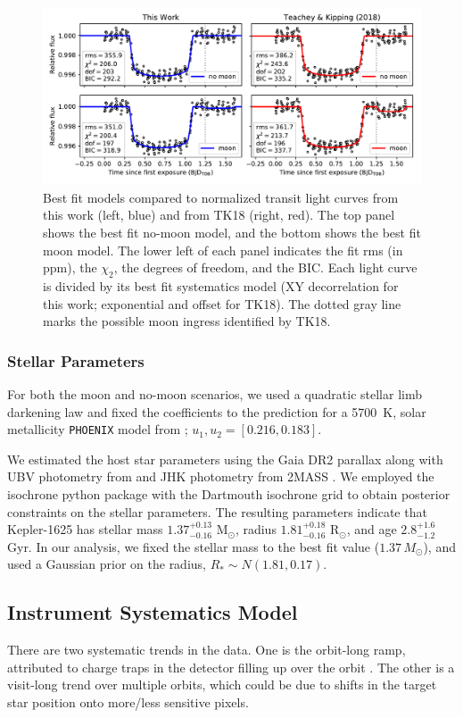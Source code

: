 \documentclass[twocolumn]{aastex62}
\begin{document}
\begin{figure}
\includegraphics[width = 1.0 \textwidth]{fig3_bestfits.pdf}
    \caption{Best fit models compared to normalized transit light curves from this work (left, blue) and from TK18 (right, red). The top panel shows the best fit no-moon model, and the bottom shows the best fit moon model. The lower left of each panel indicates the fit rms (in ppm), the $\chi_2$, the degrees of freedom, and the BIC.  Each light curve is divided by its best fit systematics model (XY decorrelation for this work; exponential and offset for TK18).  The dotted gray line marks the possible moon ingress identified by TK18.}
\label{fig:bestfit}
\end{figure}


\subsubsection{Stellar Parameters}
For both the moon and no-moon scenarios, we used a quadratic stellar limb darkening law and fixed the coefficients to the prediction for a 5700~K, solar metallicity \texttt{PHOENIX} model from \cite{espinoza15}; $u_1, u_2 = [0.216, 0.183]$.  

We estimated the host star parameters using the Gaia DR2 parallax \citep{Gaia, GaiaDR2} along with UBV photometry from \citet{Everett2012} and JHK photometry from 2MASS \citep{2MASS}. We employed the isochrone python package \citep{isochrone} with the Dartmouth isochrone grid \citep{Dotter2008} to obtain posterior constraints on the stellar parameters. The resulting parameters indicate that Kepler-1625 has stellar mass $1.37^{+0.13}_{-0.16}$ M$_{\odot}$, radius $1.81^{+0.18}_{-0.16}$ R$_{\odot}$, and age $2.8^{+1.6}_{-1.2}$ Gyr. In our analysis, we fixed the stellar mass to the best fit value ($1.37\,M_\odot$), and used a Gaussian prior on the radius, $R_* \sim N(1.81, 0.17)$.


\subsection{Instrument Systematics Model}
\label{sec:sys}
There are two systematic trends in the data. One is the orbit-long ramp, attributed to charge traps in the detector filling up over the orbit \citep{zhou17}. The other is a visit-long trend over multiple orbits, which could be due to shifts in the target star position onto more/less sensitive pixels.
\end{document}

